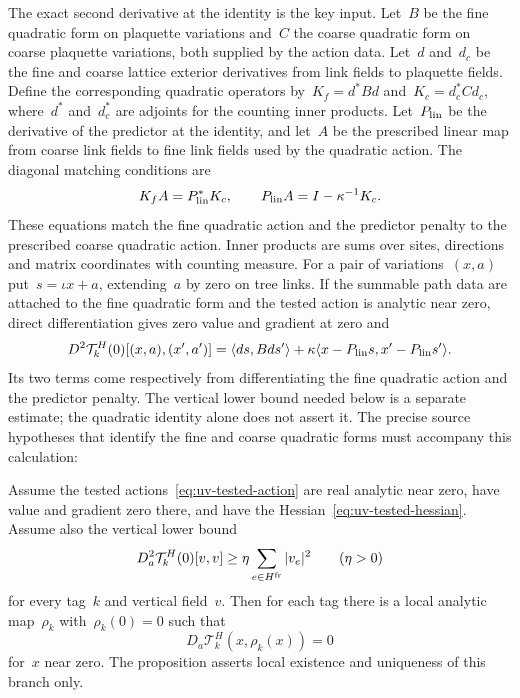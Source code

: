 The exact second derivative at the identity is the key input. Let~$B$ be the fine quadratic form on plaquette variations and~$C$ the coarse quadratic form on coarse plaquette variations, both supplied by the action data. Let~$d$ and~$d_c$ be the fine and coarse lattice exterior derivatives from link fields to plaquette fields. Define the corresponding quadratic operators by~$K_f=d^*Bd$ and~$K_c=d_c^*Cd_c$, where~$d^*$ and~$d_c^*$ are adjoints for the counting inner products. Let~$P_{\rm lin}$ be the derivative of the predictor at the identity, and let~$A$ be the prescribed linear map from coarse link fields to fine link fields used by the quadratic action. The diagonal matching conditions are
\begin{equation}\label{eq:uv-diagonal-matching}
 K_f A=P_{\rm lin}^*K_c,\qquad
 P_{\rm lin}A=I-\kappa^{-1}K_c.
\end{equation}
These equations match the fine quadratic action and the predictor penalty to the prescribed coarse quadratic action. Inner products are sums over sites, directions and matrix coordinates with counting measure. For a pair of variations~$(x,a)$ put~$s=\iota x+a$, extending~$a$ by zero on tree links. If the summable path data are attached to the fine quadratic form and the tested action is analytic near zero, direct differentiation gives zero value and gradient at zero and
\begin{equation}\label{eq:uv-tested-hessian}
 D^2\mathcal T^H_k(0)[(x,a),(x',a')]
 =\langle ds,Bds'\rangle+
   \kappa\langle x-P_{\rm lin}s,x'-P_{\rm lin}s'\rangle.
\end{equation}
Its two terms come respectively from differentiating the fine quadratic action and the predictor penalty. The vertical lower bound needed below is a separate estimate; the quadratic identity alone does not assert it. The precise source hypotheses that identify the fine and coarse quadratic forms must accompany this calculation:

\begin{proposition}\label{prop:uv-stationary-branch}
Assume the tested actions~\eqref{eq:uv-tested-action} are real analytic near zero, have value and gradient zero there, and have the Hessian~\eqref{eq:uv-tested-hessian}. Assume also the vertical lower bound
\begin{equation}\label{eq:uv-vertical-gap}
 D_a^2\mathcal T^H_k(0)[v,v]\ge\eta\sum_{e\in H^{\rm fr}}|v_e|^2
 \qquad(\eta>0)
\end{equation}
for every tag~$k$ and vertical field~$v$. Then for each tag there is a local analytic map~$\rho_k$ with~$\rho_k(0)=0$ such that
\begin{equation}\label{eq:uv-stationary-equation}
 D_a\mathcal T^H_k(x,\rho_k(x))=0
\end{equation}
for~$x$ near zero. The proposition asserts local existence and uniqueness of this branch only.
\end{proposition}

